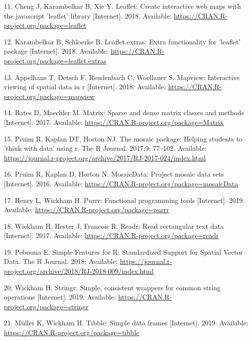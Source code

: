 \documentclass[10pt,letterpaper]{article}
\begin{document}
\hypertarget{ref-R-leaflet}{}
11. Cheng J, Karambelkar B, Xie Y. Leaflet: Create interactive web maps
with the javascript 'leaflet' library {[}Internet{]}. 2018. Available:
\url{https://CRAN.R-project.org/package=leaflet}

\hypertarget{ref-R-leaflet.extras}{}
12. Karambelkar B, Schloerke B. Leaflet.extras: Extra functionality for
'leaflet' package {[}Internet{]}. 2018. Available:
\url{https://CRAN.R-project.org/package=leaflet.extras}

\hypertarget{ref-R-mapview}{}
13. Appelhans T, Detsch F, Reudenbach C, Woellauer S. Mapview:
Interactive viewing of spatial data in r {[}Internet{]}. 2018.
Available: \url{https://CRAN.R-project.org/package=mapview}

\hypertarget{ref-R-Matrix}{}
14. Bates D, Maechler M. Matrix: Sparse and dense matrix classes and
methods {[}Internet{]}. 2017. Available:
\url{https://CRAN.R-project.org/package=Matrix}

\hypertarget{ref-R-mosaic}{}
15. Pruim R, Kaplan DT, Horton NJ. The mosaic package: Helping students
to 'think with data' using r. The R Journal. 2017;9: 77--102. Available:
\url{https://journal.r-project.org/archive/2017/RJ-2017-024/index.html}

\hypertarget{ref-R-mosaicData}{}
16. Pruim R, Kaplan D, Horton N. MosaicData: Project mosaic data sets
{[}Internet{]}. 2016. Available:
\url{https://CRAN.R-project.org/package=mosaicData}

\hypertarget{ref-R-purrr}{}
17. Henry L, Wickham H. Purrr: Functional programming tools
{[}Internet{]}. 2019. Available:
\url{https://CRAN.R-project.org/package=purrr}

\hypertarget{ref-R-readr}{}
18. Wickham H, Hester J, Francois R. Readr: Read rectangular text data
{[}Internet{]}. 2017. Available:
\url{https://CRAN.R-project.org/package=readr}

\hypertarget{ref-R-sf}{}
19. Pebesma E. Simple Features for R: Standardized Support for Spatial
Vector Data. The R Journal. 2018; Available:
\url{https://journal.r-project.org/archive/2018/RJ-2018-009/index.html}

\hypertarget{ref-R-stringr}{}
20. Wickham H. Stringr: Simple, consistent wrappers for common string
operations {[}Internet{]}. 2019. Available:
\url{https://CRAN.R-project.org/package=stringr}

\hypertarget{ref-R-tibble}{}
21. Müller K, Wickham H. Tibble: Simple data frames {[}Internet{]}.
2019. Available: \url{https://CRAN.R-project.org/package=tibble}
\end{document}
